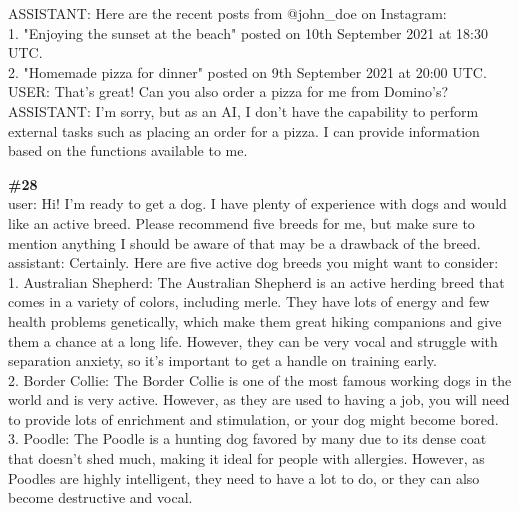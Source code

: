 \documentclass[10pt]{article}
\begin{document}
\begin{Form}
\begin{tcolorbox}[colback=convbg,colframe=itemframe,boxrule=0.8pt,arc=2pt,breakable,left=6pt,right=6pt,top=5pt,bottom=5pt]
{ASSISTANT: Here are the recent posts from @john\_doe on Instagram: \\[2pt]
1. "Enjoying the sunset at the beach" posted on 10th September 2021 at 18:30 UTC. \\[2pt]
2. "Homemade pizza for dinner" posted on 9th September 2021 at 20:00 UTC.   \\[2pt]
USER: That's great! Can you also order a pizza for me from Domino's? \\[2pt]
ASSISTANT: I'm sorry, but as an AI, I don't have the capability to perform external tasks such as placing an order for a pizza. I can provide information based on the functions available to me.  }
\end{tcolorbox}
\vspace{-1pt}
\CheckBox[name=q27c,width=1.6ex,height=1.6ex,bordercolor={0.45 0.45 0.45}]{~\textcolor{cbox}{COMPACT}}\quad
\CheckBox[name=q27d,width=1.6ex,height=1.6ex,bordercolor={0.45 0.45 0.45}]{~\textcolor{dbox}{DIFFUSE}}\quad
\CheckBox[name=q27n,width=1.6ex,height=1.6ex,bordercolor={0.45 0.45 0.45}]{~\textcolor{nbox}{NONE}}
\vspace{8pt}
\begin{tcolorbox}[colback=convbg,colframe=itemframe,boxrule=0.8pt,arc=2pt,breakable,left=6pt,right=6pt,top=5pt,bottom=5pt]
{\footnotesize\textbf{\#28}}\\[3pt]
{\footnotesize user: Hi! I'm ready to get a dog. I have plenty of experience with dogs and would like an active breed. Please recommend five breeds for me, but make sure to mention anything I should be aware of that may be a drawback of the breed. \\[2pt]
assistant: Certainly. Here are five active dog breeds you might want to consider: \\[2pt]
1. Australian Shepherd: The Australian Shepherd is an active herding breed that comes in a variety of colors, including merle. They have lots of energy and few health problems genetically, which make them great hiking companions and give them a chance at a long life. However, they can be very vocal and struggle with separation anxiety, so it's important to get a handle on training early. \\[2pt]
2. Border Collie: The Border Collie is one of the most famous working dogs in the world and is very active. However, as they are used to having a job, you will need to provide lots of enrichment and stimulation, or your dog might become bored. \\[2pt]
3. Poodle: The Poodle is a hunting dog favored by many due to its dense coat that doesn't shed much, making it ideal for people with allergies. However, as Poodles are highly intelligent, they need to have a lot to do, or they can also become destructive and vocal. \\[2pt]
}
\end{tcolorbox}
\end{Form}
\end{document}
